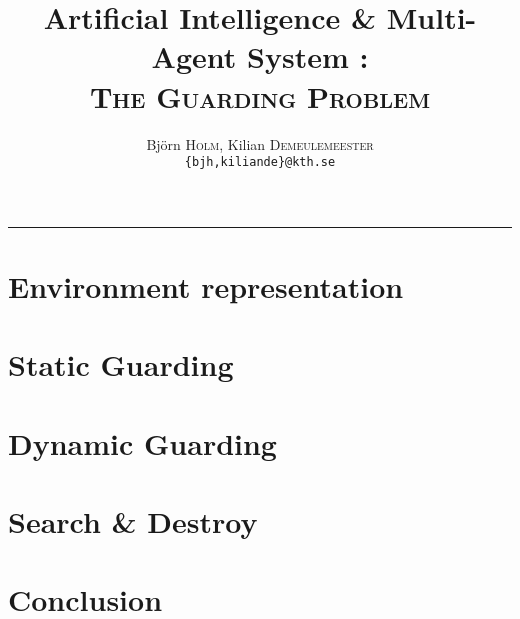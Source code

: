 \documentclass[a4paper,9pt,twocolumn]{extarticle}
\title{Artificial Intelligence \& Multi-Agent System :\\ \textsc{The Guarding Problem}}
\author{Björn \textsc{Holm}, Kilian \textsc{Demeulemeester} \\ \texttt{\{bjh,kiliande\}@kth.se}}
\begin{document}
\setlength\parindent{0em}

 \maketitle

\tableofcontents

\vspace{0.5cm}
\hrule
\vspace{0.5cm}



\section{Environment representation}


\section{Static Guarding}



\section{Dynamic Guarding}



\section{Search \& Destroy}


\section*{Conclusion}


\nocite{*}


\end{document}
